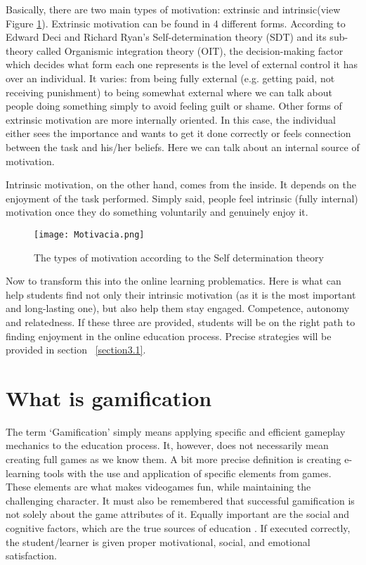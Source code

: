 \documentclass[10pt,english,a4paper]{article}
\begin{document}
	Basically, there are two main types of motivation: extrinsic and intrinsic(view Figure \ref{fig:motivation}). Extrinsic motivation can be found in 4 different forms. 
	According to Edward Deci and Richard Ryan's Self-determination theory (SDT) and its sub-theory called Organismic integration theory (OIT), the decision-making factor which decides what form each one represents is the level of external control it has over an individual. 
	It varies: from being fully external (e.g. getting paid, not receiving punishment) to being somewhat external where we can talk about people doing something simply to avoid feeling guilt or shame. Other forms of extrinsic motivation are more internally oriented. 
	In this case, the individual either sees the importance and wants to get it done correctly or feels connection between the task and his/her beliefs. Here we can talk about an internal source of motivation.
	
	Intrinsic motivation, on the other hand, comes from the inside. It depends on the enjoyment of the task performed. Simply said, people feel intrinsic (fully internal) motivation once they do something voluntarily and genuinely enjoy it.

	\begin{figure}[hp]
		\centering
		\texttt{[image: Motivacia.png]}
		\caption{\small The types of motivation according to the Self determination theory}
		\label{fig:motivation}
	\end{figure}
	
	Now to transform this into the online learning problematics. Here is what can help students find not only their intrinsic motivation (as it is the most important and long-lasting one), but also help them stay engaged. 
	Competence, autonomy and relatedness. If these three are provided, students will be on the right path to finding enjoyment in the online education process\cite{Guyan}. Precise strategies will be provided in section ~\ref{section3.1}.

\section{What is gamification} \label{section3}
	The term ‘Gamification’ simply means applying specific and efficient gameplay mechanics to the education process. It, however, does not necessarily mean creating full games as we know them\cite{Raymer}.
	A bit more precise definition is creating e-learning tools with the use and application of specific elements from games. These elements are what makes videogames fun, while maintaining the challenging character\cite{Abu-Dawood}. 
	It must also be remembered that successful gamification is not solely about the game attributes of it. Equally important are the social and cognitive factors, which are the true sources of education \cite{Raymer}.
	If executed correctly, the student/learner is given proper motivational, social, and emotional satisfaction\cite{Abu-Dawood}. 
	
\end{document}
